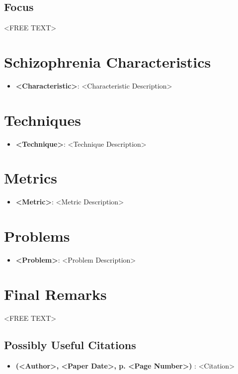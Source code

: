 \documentclass{Paper_Summary}
\begin{document}
\makepapertitle

\breakline

\begin{center}
    \section*{Focus}
\end{center}
    <FREE TEXT>

\breakline

\newpage

\section{Schizophrenia Characteristics}
    \begin{itemize}
        \item \textbf{<Characteristic>}: <Characteristic Description>
    \end{itemize}

\section{Techniques}
    \begin{itemize}
        \item \textbf{<Technique>}: <Technique Description>
    \end{itemize}

\section{Metrics}
    \begin{itemize}
        \item \textbf{<Metric>}: <Metric Description>
    \end{itemize}

\section{Problems}
    \begin{itemize}
        \item \textbf{<Problem>}: <Problem Description>
    \end{itemize}


\section{Final Remarks}
    <FREE TEXT>

\breakline

\begin{center}
    \section*{Possibly Useful Citations}
\end{center}

    \begin{itemize}
        \item \textbf{(<Author>, <Paper Date>, p. <Page Number>)} : <Citation>
    \end{itemize}
\end{document}
